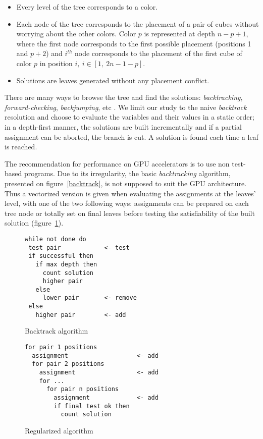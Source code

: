 \begin{itemize}   
\item Every level of the tree corresponds to a color.
\item Each node of the tree corresponds to the placement of a pair of cubes without worrying about the other colors. Color $p$ is represented at depth $n-p+1$, where the first node corresponds to the first possible placement (positions 1 and $p+2$) and $i^{th}$ node corresponds to the placement of the first cube of color $p$ in position $i, \ i \in [1, \ 2n-1-p]$.
\item Solutions are leaves generated without any placement conflict.
\end{itemize}

There are many ways to browse the tree and find the solutions: \emph{backtracking}, \emph{forward-checking}, \emph{backjumping}, etc \cite{prosser93hybrid}. 
We limit our study to the naive \emph{backtrack} resolution and choose to evaluate the variables and their values in a static order; in a depth-first manner, the solutions are built incrementally and if a partial assignment can be aborted, the branch is cut. A solution is found each time a leaf is reached.

The recommendation for performance on GPU accelerators is to use non test-based programs.
Due to its irregularity, the basic \emph{backtracking} algorithm, presented on figure~\ref{backtrack}, is not supposed to suit the GPU architecture.
Thus a vectorized version is given when evaluating the assignments at the leaves' level, with one of the two following ways: assignments can be prepared on each tree node or totally set on final leaves before testing the satisfiability of the built solution (figure~\ref{regularized}).

\begin{figure}[htb]
\begin{minipage}[b]{0.45\linewidth}
\footnotesize
\begin{verbatim}
while not done do
 test pair            <- test
 if successful then 
   if max depth then
     count solution
     higher pair	                  
   else
     lower pair       <- remove
 else
   higher pair        <- add
\end{verbatim}
\caption{Backtrack algorithm}\label{backtrack}
\end{minipage}
\begin{minipage}[b]{0.45\linewidth}
\footnotesize
\begin{verbatim}
for pair 1 positions
  assignment                   <- add
  for pair 2 positions
    assignment                 <- add
    for ...
      for pair n positions
        assignment             <- add
        if final test ok then  
          count solution
\end{verbatim}
\caption{Regularized algorithm}\label{regularized}
\end{minipage}
\end{figure}

